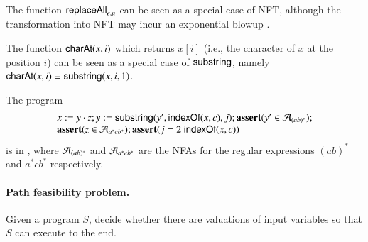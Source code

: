 \begin{remark}
The function $\mathsf{replaceAll}_{e,u}$ can be seen as a special case of NFT, although the transformation into NFT may incur an exponential blowup \cite{CCH+18}.
\end{remark}


\begin{remark}
The function $\mathsf{charAt}(x, i)$ which returns $x[i]$ (i.e., the character of $x$ at the position $i$) can be seen as a special case of $\mathsf{substring}$, namely $\mathsf{charAt}(x, i) \equiv \mathsf{substring}(x, i, 1)$.
\end{remark}

\begin{example}
The program 
\[
\begin{array}{l}
x:= y \cdot z; y := \mathsf{substring}(y', \mathsf{indexOf}(x, c), j); \textbf{assert}(y' \in \mathcal{A}_{(ab)^*}); \\
\textbf{assert}(z \in \mathcal{A}_{a^* c b^*}); \textbf{assert}(j = 2\ \mathsf{indexOf}(x, c))
\end{array}
\] 
is in {\slint}, where $\mathcal{A}_{(ab)^*}$ and $\mathcal{A}_{a^* c b^*}$ are the NFAs for the regular expressions $(ab)^*$ and $a^* c b^*$ respectively.
\end{example}


\paragraph*{Path feasibility problem.} Given a {\slint} program $S$, decide whether there are valuations of input variables so that $S$ can execute to the end.

%
















